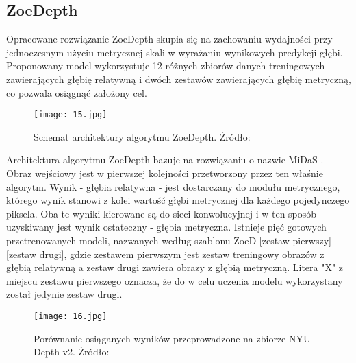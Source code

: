 \subsection{ZoeDepth}
Opracowane rozwiązanie ZoeDepth \cite{bhat2023} skupia się na zachowaniu wydajności przy jednoczesnym użyciu metrycznej skali w wyrażaniu wynikowych predykcji głębi. Proponowany model wykorzystuje 12 różnych zbiorów danych treningowych zawierających głębię relatywną i dwóch zestawów zawierających głębię metryczną, co pozwala osiągnąć założony cel.
\begin{figure}[H]
    \centering
    \texttt{[image: 15.jpg]}
    \caption{Schemat architektury algorytmu ZoeDepth. Źródło: \cite{bhat2023}}
    \label{fig:zoe-schema}
\end{figure}
Architektura algorytmu ZoeDepth bazuje na rozwiązaniu o nazwie MiDaS \cite{ranftl2020}. Obraz wejściowy jest w pierwszej kolejności przetworzony przez ten właśnie algorytm. Wynik - głębia relatywna - jest dostarczany do modułu metrycznego, którego wynik stanowi z kolei wartość głębi metrycznej dla każdego pojedynczego piksela. Oba te wyniki kierowane są do sieci konwolucyjnej i w ten sposób uzyskiwany jest wynik ostateczny - głębia metryczna. Istnieje pięć gotowych przetrenowanych modeli, nazwanych według szablonu ZoeD-[zestaw pierwszy]-[zestaw drugi], gdzie zestawem pierwszym jest zestaw treningowy obrazów z głębią relatywną a zestaw drugi zawiera obrazy z głębią metryczną. Litera "X" z miejscu zestawu pierwszego oznacza, że do w celu uczenia modelu wykorzystany został jedynie zestaw drugi.
\begin{figure}[H]
    \centering
    \texttt{[image: 16.jpg]}
    \caption{Porównanie osiąganych wyników przeprowadzone na zbiorze NYU-Depth v2. Źródło: \cite{bhat2023}}
    \label{fig:zoe-results}
\end{figure}


